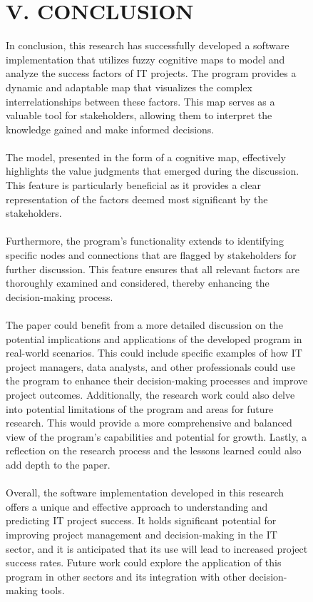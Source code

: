 \documentclass{article}
\begin{document}
\begin{figure}[!t]
\begin{minipage}{0.49\textwidth}
\begin{center}
                \chapter{V. CONCLUSION}
            \end{center}
            In conclusion, this research has successfully developed a software implementation that utilizes fuzzy cognitive maps to model and analyze the success factors of IT projects. The program provides a dynamic and adaptable map that visualizes the complex interrelationships between these factors. This map serves as a valuable tool for stakeholders, allowing them to interpret the knowledge gained and make informed decisions.\\
            ~\\
            The model, presented in the form of a cognitive map, effectively highlights the value judgments that emerged during the discussion. This feature is particularly beneficial as it provides a clear representation of the factors deemed most significant by the stakeholders.\\
            ~\\
            Furthermore, the program's functionality extends to identifying specific nodes and connections that are flagged by stakeholders for further discussion. This feature ensures that all relevant factors are thoroughly examined and considered, thereby enhancing the decision-making process.\\
            ~\\
            The paper could benefit from a more detailed discussion on the potential implications and applications of the developed program in real-world scenarios. This could include specific examples of how IT project managers, data analysts, and other professionals could use the program to enhance their decision-making processes and improve project outcomes. Additionally, the research work could also delve into potential limitations of the program and areas for future research. This would provide a more comprehensive and balanced view of the program's capabilities and potential for growth. Lastly, a reflection on the research process and the lessons learned could also add depth to the paper.\\
            ~\\
            Overall, the software implementation developed in this research offers a unique and effective approach to understanding and predicting IT project success. It holds significant potential for improving project management and decision-making in the IT sector, and it is anticipated that its use will lead to increased project success rates. Future work could explore the application of this program in other sectors and its integration with other decision-making tools.\\

\end{minipage}
\end{figure}
\end{document}
